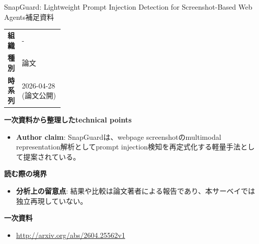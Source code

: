 \begin{technicalnote}{SnapGuard: Lightweight Prompt Injection Detection for Screenshot-Based Web Agents}{補足資料}
\begingroup
\begin{tabularx}{\linewidth}{@{}>{\bfseries}p{0.22\linewidth}X@{}}
組織 & - \\
種別 & 論文 \\
時系列 & 2026-04-28 (論文公開) \\
\end{tabularx}
\smallskip
{\bfseries 一次資料から整理したtechnical points}
\begin{itemize}[leftmargin=1.5em,itemsep=0.35em]
\item \textbf{Author claim}: SnapGuardは、webpage screenshotのmultimodal representation解析としてprompt injection検知を再定式化する軽量手法として提案されている。
\end{itemize}
\begin{minipage}{\linewidth}
{\bfseries 読む際の境界}
\begin{itemize}[leftmargin=1.5em,itemsep=0.35em]
\item \textbf{分析上の留意点}: 結果や比較は論文著者による報告であり、本サーベイでは独立再現していない。
\end{itemize}
\begin{samepage}
{\bfseries 一次資料}
\begingroup\sloppy
\begin{itemize}[leftmargin=1.5em,itemsep=0.25em]
\item {\scriptsize\url{http://arxiv.org/abs/2604.25562v1}}
\end{itemize}
\endgroup
\end{samepage}
\end{minipage}
\endgroup
\end{technicalnote}
\medskip

